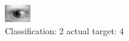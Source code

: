 \begin{figure}[h!]
\begin{center}
\includegraphics[width=0.60\columnwidth]{figures/ID843_class_2_target_4.png}
\end{center}
\caption{ Classification: 2 actual target: 4}
\label{fig:ID843_class_2_target_4}
\end{figure}
